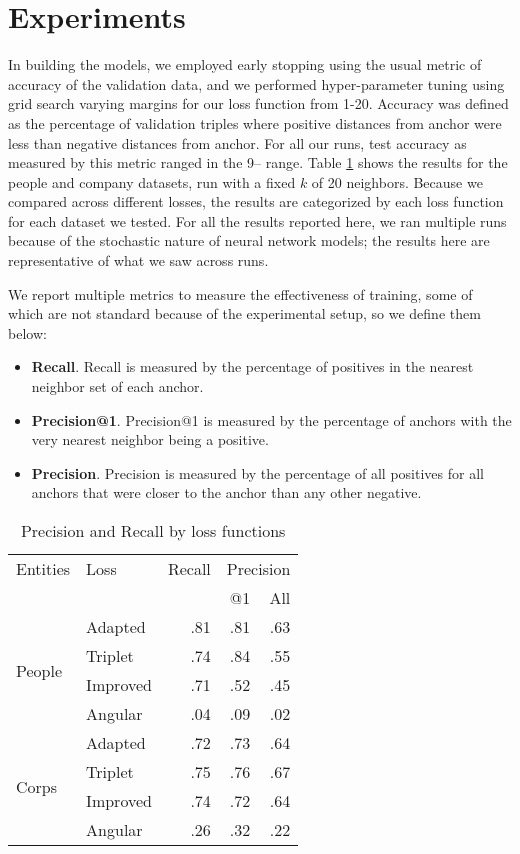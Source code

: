 \section{Experiments}
\label{results}
In building the models, we employed early stopping using the usual metric of accuracy of the validation data, and we performed hyper-parameter tuning using grid search varying margins for our loss function from 1-20.  Accuracy was defined as the percentage of validation triples where positive distances from anchor were less than negative distances from anchor.  For all our runs, test accuracy as measured by this metric ranged in the 9-- range.  Table \ref{Evaluation} shows the results for the people and company datasets, run with a fixed $k$ of 20 neighbors.  Because we compared across different losses, the results are categorized by each loss function for each dataset we tested.  For all the results reported here, we ran multiple runs because of the stochastic nature of neural network models; the results here are representative of what we saw across runs. 

We report multiple metrics to measure the effectiveness of training, some of which are not standard because of the experimental setup, so we define them below:
\begin{itemize}
\item \textbf{Recall}.  Recall is measured by the percentage of positives in the nearest neighbor set of each anchor.
\item \textbf{Precision@1}.  Precision@1 is measured by the percentage of anchors with the very nearest neighbor being a positive.
\item \textbf{Precision}.  Precision is measured by the percentage of all positives for all anchors that were closer to the anchor than any other negative.
\end{itemize}
 
\begin{table}[ht]
\caption{Precision and Recall by loss functions}
\label{Evaluation}
\begin{center}
\begin{tabular}{|l|l|r|r|r|}
\hline
Entities & Loss & Recall & \multicolumn{2}{|c|}{Precision} \\
 & & & @1 & All \\
\hline
\multirow{4}{*}{People} & Adapted & .81 & .81 & .63 \\
\cline{2-5}
& Triplet & .74 & .84 & .55 \\
\cline{2-5}
& Improved & .71 & .52 & .45 \\
\cline{2-5}
& Angular & .04 & .09 & .02 \\
\hline
\multirow{4}{*}{Corps} & Adapted & .72 & .73 & .64 \\
\cline{2-5}
& Triplet & .75 & .76 & .67 \\
\cline{2-5}
& Improved & .74 & .72 & .64 \\
\cline{2-5}
& Angular & .26 & .32 & .22 \\
\hline
\end{tabular} %
\end{center}
\end{table}


